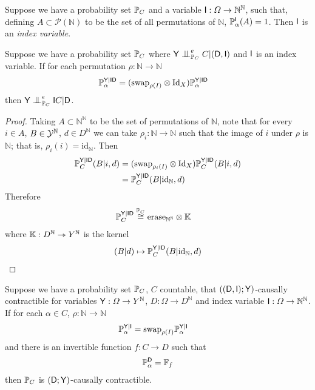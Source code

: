 \begin{definition}
Suppose we have a probability set $\mathbb{P}_C$ and a variable $\mathsf{I}:\Omega\to \mathbb{N}^{\mathbb{N}}$, such that, defining $A\subset\mathscr{P}(\mathbb{N})$ to be the set of all permutations of $\mathbb{N}$, $\mathbb{P}_\alpha^{\mathsf{I}}(A)=1$. Then $\mathsf{I}$ is an \emph{index variable}.
\end{definition}

\begin{lemma}\label{lem:ind}
Suppose we have a probability set $\mathbb{P}_C$ where $\RV{Y}\CI_{\prob{P}_C}^e C|(\RV{D},\RV{I})$ and $\mathsf{I}$ is an index variable. If for each permutation $\rho:\mathbb{N}\to \mathbb{N}$
\begin{align}
    \mathbb{P}_\alpha^{\mathsf{Y}|\mathsf{ID}} &= (\text{swap}_{\rho(I)}\otimes \text{Id}_X )\mathbb{P}_\alpha^{\mathsf{Y}|\mathsf{ID}}
\end{align}
then $\RV{Y}\CI_{\prob{P}_C}^e \RV{I}C|\RV{D}$.
\end{lemma}

\begin{proof}
Taking $A\subset \mathbb{N}^{\mathbb{N}}$ to be the set of permutations of $\mathbb{N}$, note that for every $i\in A$, $B\in\mathcal{Y}^{\mathbb{N}}$, $d\in D^{\mathbb{N}}$ we can take $\rho_i:\mathbb{N}\to \mathbb{N}$ such that the image of $i$ under $\rho$ is $\mathbb{N}$; that is, $\rho_i(i)=\text{id}_{\mathbb{N}}$. Then
\begin{align}
    \mathbb{P}_C^{\mathsf{Y}|\mathsf{ID}}(B|i,d) &= (\text{swap}_{\rho_i(I)}\otimes \text{Id}_X )\mathbb{P}_C^{\mathsf{Y}|\mathsf{ID}}(B|i,d)\\
    &= \mathbb{P}_C^{\mathsf{Y}|\mathsf{ID}}(B|\text{id}_{\mathbb{N}},d)
\end{align}
Therefore
\begin{align}
    \mathbb{P}_C^{\mathsf{Y}|\mathsf{ID}} &\overset{\mathbb{P}_C}{\cong} \text{erase}_{\mathbb{N}^{\mathbb{N}}}\otimes \mathbb{K} 
\end{align}
where $\mathbb{K}:D^{\mathbb{N}}\rightarrowtriangle Y^{\mathbb{N}}$ is the kernel
\begin{align}
    (B|d)\mapsto \mathbb{P}_C^{\mathsf{Y}|\mathsf{ID}}(B|\text{id}_{\mathbb{N}},d)
\end{align}
\end{proof}


\begin{theorem}\label{th:cc_ind_treat}
Suppose we have a probability set $\mathbb{P}_C$, $C$ countable, that $((\mathsf{D},\mathsf{I});\mathsf{Y})$-causally contractible for variables $\mathsf{Y}:\Omega\to Y^{\mathbb{N}}$, $D:\Omega\to D^{\mathbb{N}}$ and index variable $\mathsf{I}:\Omega\to \mathbb{N}^{\mathbb{N}}$. If for each $\alpha\in C$, $\rho:\mathbb{N}\to \mathbb{N}$
\begin{align}
    \mathbb{P}_\alpha^{\mathsf{Y}|\mathsf{I}} &= \text{swap}_{\rho(I)}\mathbb{P}_\alpha^{\mathsf{Y}|\mathsf{I}}
\end{align}
and there is an invertible function $f:C\to D$ such that
\begin{align}
    \mathbb{P}_\alpha^{\mathsf{D}} = \mathbb{F}_f
\end{align}
then $\mathbb{P}_C$ is $(\mathsf{D};\mathsf{Y})$-causally contractible.
\end{theorem}

